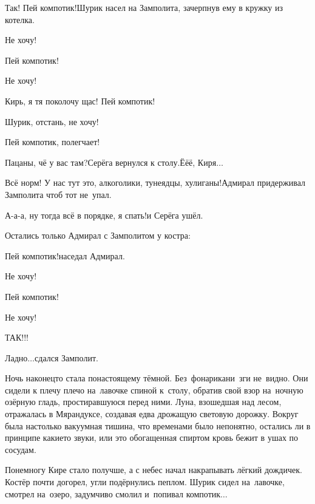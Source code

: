 \diagdash Так! Пей компотик!\mdash Шурик насел на Замполита, зачерпнув ему в кружку из котелка.

\diagdash Не хочу!

\diagdash Пей компотик!

\diagdash Не хочу!

\diagdash Кирь, я тя поколочу щас! Пей компотик!

\diagdash Шурик, отстань, не хочу!

\diagdash Пей компотик, полегчает!

\diagdash Пацаны, чё у вас там?\mdash Серёга вернулся к столу.\mdash Ё\sdash ё\sdash ё, Киря$\ldots$

\diagdash Всё норм! У нас тут это, алкоголики, тунеядцы, хулиганы!\mdash Адмирал придерживал Замполита чтоб тот не~упал.

\diagdash А-а-а, ну тогда всё в порядке, я спать!\mdash и Серёга ушёл.

Остались только Адмирал с Замполитом у костра: 

\diagdash Пей компотик!\mdash наседал Адмирал.

\diagdash Не хочу!

\diagdash Пей компотик!

\diagdash Не хочу!

\diagdash ТАК!!!

\diagdash Ладно$\ldots$\mdash сдался Замполит.

Ночь наконец\sdash то стала по\sdash настоящему тёмной. Без~фонарика\mdash ни~зги не~видно. Они сидели к плечу плечо на~лавочке спиной к~столу, обратив свой взор на~ночную озёрную гладь, простиравшуюся перед ними. Луна, взошедшая над лесом, отражалась в Мярандуксе, создавая едва дрожащую световую дорожку. Вокруг была настолько вакуумная тишина, что временами было непонятно, остались ли в принципе какие\sdash то звуки, или это обогащенная спиртом кровь бежит в ушах по сосудам.


Понемногу Кире стало получше, а с небес начал накрапывать лёгкий дождичек. Костёр почти догорел, угли подёрнулись пеплом. Шурик сидел на~лавочке, смотрел на~озеро, задумчиво смолил и~попивал компотик$\ldots$


\begin{center}
\end{center}
